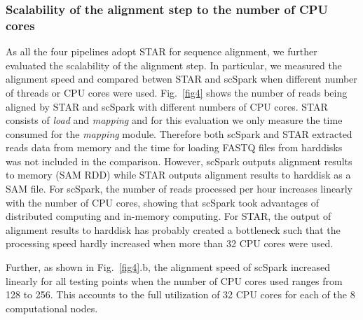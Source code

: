 \documentclass[conference]{IEEEtran}
\begin{document}
\subsubsection{Scalability of the alignment step to the number of CPU cores}
As all the four pipelines adopt STAR for sequence alignment, we further evaluated the scalability of the alignment step. 
In particular, we measured the alignment speed and compared betwen STAR and scSpark when different number of threads or CPU cores were used. 
Fig.~\ref{fig4} shows the number of reads being aligned by STAR and scSpark with different numbers of CPU cores. 
STAR consists of \textit{load} and \textit{mapping} and for this evaluation we only measure the time consumed for the \textit{mapping} module. Therefore both scSpark and STAR extracted reads data from memory and the time for loading FASTQ files from harddisks was not included in the comparison. However, scSpark outputs alignment results to memory (SAM RDD) while STAR outputs alignment results to harddisk as a SAM file.  
For scSpark, the number of reads processed per hour increases linearly with the number of CPU cores, showing that scSpark took advantages of distributed computing and in-memory computing. 
For STAR, the output of alignment results to harddisk has probably created a bottleneck such that the processing speed hardly increased when more than 32 CPU cores were used. 


Further, as shown in Fig.~\ref{fig4}.b, the alignment speed of scSpark increased linearly for all testing points when the number of CPU cores used ranges from 128 to 256. This accounts to the full utilization of 32 CPU cores for each of the 8 computational nodes.  
\end{document}
